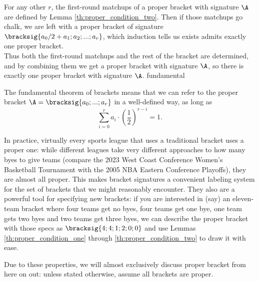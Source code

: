 {{        For any other $r$, the first-round matchups of a proper bracket with signature $\A$ are defined by Lemma \ref{th:proper_condition_two}. Then if those matchups go chalk, we are left with a proper bracket of signature $\bracksig{a_0/2 + a_1; a_2; ...; a_r}$, which induction tells us exists admits exactly one proper bracket.\\

        Thus both the first-round matchups and the rest of the bracket are determined, and by combining them we get a proper bracket with signature $\A$, so there is exactly one proper bracket with signature $\A$.
    }{fundamental}

    The fundamental theorem of brackets means that we can refer to the proper bracket $\A = \bracksig{a_0; ...; a_r}$ in a well-defined way, as long as $$\sum_{i=0}^r a_i \cdot \left(\frac{1}{2}\right)^{r - i} = 1.$$

    In practice, virtually every sports league that uses a traditional bracket uses a proper one: while different leagues take very different approaches to how many byes to give teams (compare the 2023 West Coast Conference Women's Basketball Tournament with the 2005 NBA Eastern Conference Playoffs), they are almost all proper. This makes bracket signatures a convenient labeling system for the set of brackets that we might reasonably encounter. They also are a powerful tool for specifying new brackets: if you are interested in (say) an eleven-team bracket where four teams get no byes, four teams get one bye, one team gets two byes and two teams get three byes, we can describe the proper bracket with those specs as $\bracksig{4; 4; 1; 2; 0; 0}$ and use Lemmas \ref{th:proper_condition_one} through \ref{th:proper_condition_two} to draw it with ease.


    Due to these properties, we will almost exclusively discuss proper bracket from here on out: unless stated otherwise, assume all brackets are proper.
}